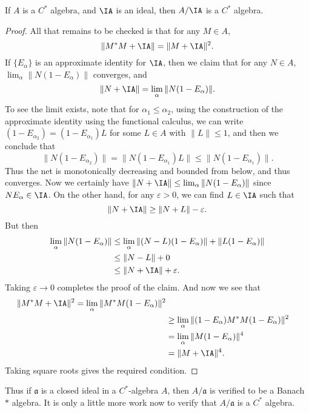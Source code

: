 \begin{theorem}
    If $A$ is a $C^*$ algebra, and $\IA$ is an ideal, then $A / \IA$ is a $C^*$ algebra.
\end{theorem}
\begin{proof}
    All that remains to be checked is that for any $M \in A$,
    \[ \| M^* M + \IA \| = \| M + \IA \|^2. \]
    If $\{ E_\alpha \}$ is an approximate identity for $\IA$, then we claim that for any $N \in A$, $\lim_\alpha \| N(1 - E_\alpha) \|$ converges, and
    \[ \| N + \IA \| = \lim_\alpha \| N(1 - E_\alpha) \|. \]
    To see the limit exists, note that for $\alpha_1 \leq \alpha_2$, using the construction of the approximate identity using the functional calculus, we can write $(1 - E_{\alpha_2}) = (1 - E_{\alpha_1}) L$ for some $L \in A$ with $\| L \| \leq 1$, and then we conclude that
    \[ \| N(1 - E_{\alpha_2}) \| = \| N (1 - E_{\alpha_1}) L \| \leq \| N (1 - E_{\alpha_1}) \|. \]
    Thus the net is monotonically decreasing and bounded from below, and thus converges. Now we certainly have $\| N + \IA \| \leq \lim_\alpha \| N(1 - E_\alpha) \|$ since $N E_\alpha \in \IA$. On the other hand, for any $\varepsilon > 0$, we can find $L \in \IA$ such that
    \[ \| N + \IA \| \geq \| N + L \| - \varepsilon. \]
    But then
    \begin{align*}
        \lim_\alpha \| N(1 - E_\alpha) \| &\leq \lim_\alpha \| (N - L)(1 - E_\alpha) \| + \| L(1 - E_\alpha) \|\\
        &\leq  \| N - L \| + 0\\
        &\leq \| N + \IA \| + \varepsilon.
    \end{align*}
    Taking $\varepsilon \to 0$ completes the proof of the claim. And now we see that
    \begin{align*}
        \| M^* M + \IA \|^2 = \lim_\alpha \| M^* M (1 - E_\alpha) \|^2\\
        &\geq \lim_\alpha \| (1 - E_\alpha) M^* M (1 - E_\alpha) \|^2\\
        &= \lim_\alpha \| M (1 - E_\alpha) \|^4\\
        &= \| M + \IA \|^4.
    \end{align*}
    Taking square roots gives the required condition.
\end{proof}

Thus if $\mathfrak{a}$ is a closed ideal in a $C^*$-algebra $A$, then $A/\mathfrak{a}$ is verified to be a Banach $*$ algebra. It is only a little more work now to verify that $A/\mathfrak{a}$ is a $C^*$ algebra.

